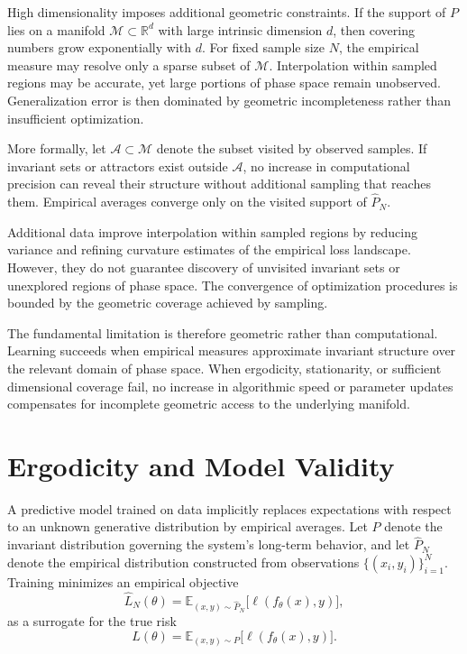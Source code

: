 \documentclass[12pt]{book}
\begin{document}
High dimensionality imposes additional geometric constraints. If the support of $P$ lies on a manifold $\mathcal{M} \subset \mathbb{R}^d$ with large intrinsic dimension $d$, then covering numbers grow exponentially with $d$. For fixed sample size $N$, the empirical measure may resolve only a sparse subset of $\mathcal{M}$. Interpolation within sampled regions may be accurate, yet large portions of phase space remain unobserved. Generalization error is then dominated by geometric incompleteness rather than insufficient optimization.

More formally, let $\mathcal{A} \subset \mathcal{M}$ denote the subset visited by observed samples. If invariant sets or attractors exist outside $\mathcal{A}$, no increase in computational precision can reveal their structure without additional sampling that reaches them. Empirical averages converge only on the visited support of $\hat{P}_N$.

Additional data improve interpolation within sampled regions by reducing variance and refining curvature estimates of the empirical loss landscape. However, they do not guarantee discovery of unvisited invariant sets or unexplored regions of phase space. The convergence of optimization procedures is bounded by the geometric coverage achieved by sampling.

The fundamental limitation is therefore geometric rather than computational. Learning succeeds when empirical measures approximate invariant structure over the relevant domain of phase space. When ergodicity, stationarity, or sufficient dimensional coverage fail, no increase in algorithmic speed or parameter updates compensates for incomplete geometric access to the underlying manifold.

\section{Ergodicity and Model Validity}

A predictive model trained on data implicitly replaces expectations with respect to an unknown generative distribution by empirical averages. Let $P$ denote the invariant distribution governing the system's long-term behavior, and let $\hat{P}_N$ denote the empirical distribution constructed from observations $\{(x_i,y_i)\}_{i=1}^N$. Training minimizes an empirical objective
\[
\hat{L}_N(\theta)
=
\mathbb{E}_{(x,y)\sim \hat{P}_N}
\big[ \ell(f_\theta(x),y) \big],
\]
as a surrogate for the true risk
\[
L(\theta)
=
\mathbb{E}_{(x,y)\sim P}
\big[ \ell(f_\theta(x),y) \big].
\]
\end{document}
